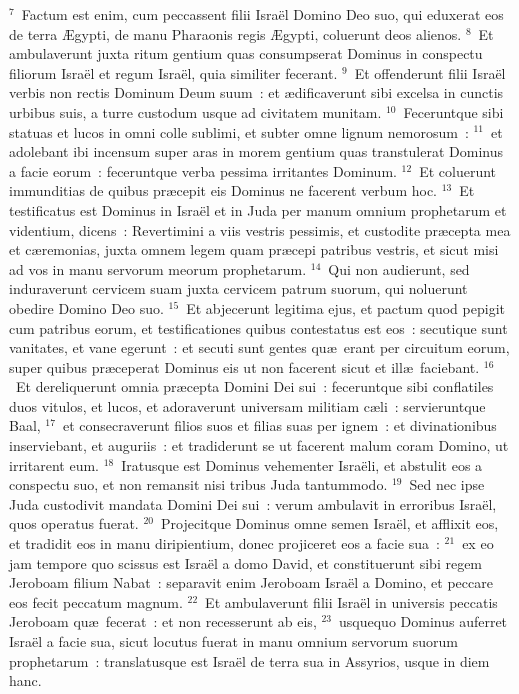${}^{7}$~Factum est enim, cum peccassent filii Isra\"el Domino Deo suo, qui eduxerat eos de terra \AE gypti, de manu Pharaonis regis \AE gypti, coluerunt deos alienos.
${}^{8}$~Et ambulaverunt juxta ritum gentium quas consumpserat Dominus in conspectu filiorum Isra\"el et regum Isra\"el, quia similiter fecerant.
${}^{9}$~Et offenderunt filii Isra\"el verbis non rectis Dominum Deum suum~: et \ae dificaverunt sibi excelsa in cunctis urbibus suis, a turre custodum usque ad civitatem munitam.
${}^{10}$~Feceruntque sibi statuas et lucos in omni colle sublimi, et subter omne lignum nemorosum~:
${}^{11}$~et adolebant ibi incensum super aras in morem gentium quas transtulerat Dominus a facie eorum~: feceruntque verba pessima irritantes Dominum.
${}^{12}$~Et coluerunt immunditias de quibus pr\ae cepit eis Dominus ne facerent verbum hoc.
${}^{13}$~Et testificatus est Dominus in Isra\"el et in Juda per manum omnium prophetarum et videntium, dicens~: Revertimini a viis vestris pessimis, et custodite pr\ae cepta mea et c\ae remonias, juxta omnem legem quam pr\ae cepi patribus vestris, et sicut misi ad vos in manu servorum meorum prophetarum.
${}^{14}$~Qui non audierunt, sed induraverunt cervicem suam juxta cervicem patrum suorum, qui noluerunt obedire Domino Deo suo.
${}^{15}$~Et abjecerunt legitima ejus, et pactum quod pepigit cum patribus eorum, et testificationes quibus contestatus est eos~: secutique sunt vanitates, et vane egerunt~: et secuti sunt gentes qu\ae\ erant per circuitum eorum, super quibus pr\ae ceperat Dominus eis ut non facerent sicut et ill\ae\ faciebant.
${}^{16}$~Et dereliquerunt omnia pr\ae cepta Domini Dei sui~: feceruntque sibi conflatiles duos vitulos, et lucos, et adoraverunt universam militiam c\ae li~: servieruntque Baal,
${}^{17}$~et consecraverunt filios suos et filias suas per ignem~: et divinationibus inserviebant, et auguriis~: et tradiderunt se ut facerent malum coram Domino, ut irritarent eum.
${}^{18}$~Iratusque est Dominus vehementer Isra\"eli, et abstulit eos a conspectu suo, et non remansit nisi tribus Juda tantummodo.
${}^{19}$~Sed nec ipse Juda custodivit mandata Domini Dei sui~: verum ambulavit in erroribus Isra\"el, quos operatus fuerat.
${}^{20}$~Projecitque Dominus omne semen Isra\"el, et afflixit eos, et tradidit eos in manu diripientium, donec projiceret eos a facie sua~:
${}^{21}$~ex eo jam tempore quo scissus est Isra\"el a domo David, et constituerunt sibi regem Jeroboam filium Nabat~: separavit enim Jeroboam Isra\"el a Domino, et peccare eos fecit peccatum magnum.
${}^{22}$~Et ambulaverunt filii Isra\"el in universis peccatis Jeroboam qu\ae\ fecerat~: et non recesserunt ab eis,
${}^{23}$~usquequo Dominus auferret Isra\"el a facie sua, sicut locutus fuerat in manu omnium servorum suorum prophetarum~: translatusque est Isra\"el de terra sua in Assyrios, usque in diem hanc.


